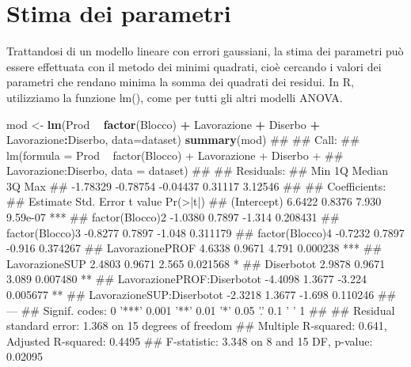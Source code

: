 \documentclass[a4paper,12pt,oneside]{book}
\newenvironment{Shaded}{\begin{snugshade}}{\end{snugshade}}
\newcommand{\KeywordTok}[1]{\textcolor[rgb]{0.13,0.29,0.53}{\textbf{#1}}}
\newcommand{\DataTypeTok}[1]{\textcolor[rgb]{0.13,0.29,0.53}{#1}}
\newcommand{\StringTok}[1]{\textcolor[rgb]{0.31,0.60,0.02}{#1}}
\newcommand{\OperatorTok}[1]{\textcolor[rgb]{0.81,0.36,0.00}{\textbf{#1}}}
\newcommand{\NormalTok}[1]{#1}
\theoremstyle{definition}
\theoremstyle{definition}
\theoremstyle{definition}
\theoremstyle{remark}
\begin{document}
\section{Stima dei parametri}\label{stima-dei-parametri-1}

Trattandosi di un modello lineare con errori gaussiani, la stima dei
parametri può essere effettuata con il metodo dei minimi quadrati, cioè
cercando i valori dei parametri che rendano minima la somma dei quadrati
dei residui. In R, utilizziamo la funzione lm(), come per tutti gli
altri modelli ANOVA.

\begin{Shaded}
\begin{Highlighting}[]
\NormalTok{mod <-}\StringTok{ }\KeywordTok{lm}\NormalTok{(Prod }\OperatorTok{~}\StringTok{ }\KeywordTok{factor}\NormalTok{(Blocco) }\OperatorTok{+}\StringTok{ }\NormalTok{Lavorazione }\OperatorTok{+}\StringTok{ }\NormalTok{Diserbo }\OperatorTok{+}
\StringTok{            }\NormalTok{Lavorazione}\OperatorTok{:}\NormalTok{Diserbo, }\DataTypeTok{data=}\NormalTok{dataset)}
\KeywordTok{summary}\NormalTok{(mod)}
\NormalTok{## }
\NormalTok{## Call:}
\NormalTok{## lm(formula = Prod ~ factor(Blocco) + Lavorazione + Diserbo + }
\NormalTok{##     Lavorazione:Diserbo, data = dataset)}
\NormalTok{## }
\NormalTok{## Residuals:}
\NormalTok{##      Min       1Q   Median       3Q      Max }
\NormalTok{## -1.78329 -0.78754 -0.04437  0.31117  3.12546 }
\NormalTok{## }
\NormalTok{## Coefficients:}
\NormalTok{##                            Estimate Std. Error t value Pr(>|t|)    }
\NormalTok{## (Intercept)                  6.6422     0.8376   7.930 9.59e-07 ***}
\NormalTok{## factor(Blocco)2             -1.0380     0.7897  -1.314 0.208431    }
\NormalTok{## factor(Blocco)3             -0.8277     0.7897  -1.048 0.311179    }
\NormalTok{## factor(Blocco)4             -0.7232     0.7897  -0.916 0.374267    }
\NormalTok{## LavorazionePROF              4.6338     0.9671   4.791 0.000238 ***}
\NormalTok{## LavorazioneSUP               2.4803     0.9671   2.565 0.021568 *  }
\NormalTok{## Diserbotot                   2.9878     0.9671   3.089 0.007480 ** }
\NormalTok{## LavorazionePROF:Diserbotot  -4.4098     1.3677  -3.224 0.005677 ** }
\NormalTok{## LavorazioneSUP:Diserbotot   -2.3218     1.3677  -1.698 0.110246    }
\NormalTok{## ---}
\NormalTok{## Signif. codes:  0 '***' 0.001 '**' 0.01 '*' 0.05 '.' 0.1 ' ' 1}
\NormalTok{## }
\NormalTok{## Residual standard error: 1.368 on 15 degrees of freedom}
\NormalTok{## Multiple R-squared:  0.641,  Adjusted R-squared:  0.4495 }
\NormalTok{## F-statistic: 3.348 on 8 and 15 DF,  p-value: 0.02095}
\end{Highlighting}
\end{Shaded}
\end{document}
